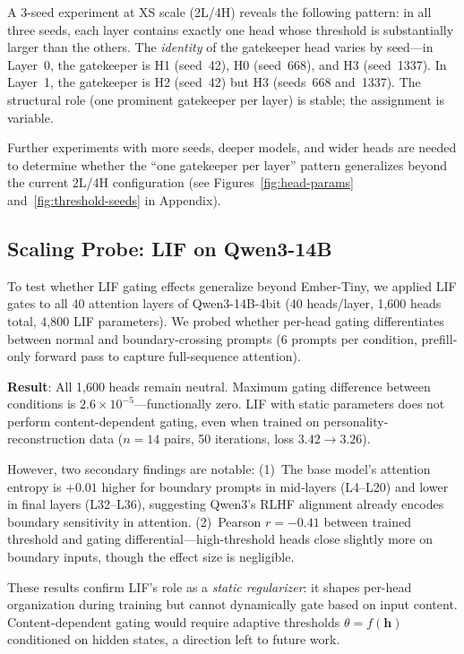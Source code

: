 \documentclass[11pt]{article}
\begin{document}
A 3-seed experiment at XS scale (2L/4H) reveals the following pattern: in all three seeds, each layer contains exactly one head whose threshold is substantially larger than the others. The \emph{identity} of the gatekeeper head varies by seed---in Layer~0, the gatekeeper is H1 (seed~42), H0 (seed~668), and H3 (seed~1337). In Layer~1, the gatekeeper is H2 (seed~42) but H3 (seeds~668 and~1337). The structural role (one prominent gatekeeper per layer) is stable; the assignment is variable.

Further experiments with more seeds, deeper models, and wider heads are needed to determine whether the ``one gatekeeper per layer'' pattern generalizes beyond the current 2L/4H configuration (see Figures~\ref{fig:head-params} and~\ref{fig:threshold-seeds} in Appendix).

\subsection{Scaling Probe: LIF on Qwen3-14B}
\label{sec:qwen3}

To test whether LIF gating effects generalize beyond Ember-Tiny, we applied LIF gates to all 40 attention layers of Qwen3-14B-4bit (40 heads/layer, 1,600 heads total, 4,800 LIF parameters). We probed whether per-head gating differentiates between normal and boundary-crossing prompts (6 prompts per condition, prefill-only forward pass to capture full-sequence attention).

\textbf{Result}: All 1,600 heads remain neutral. Maximum gating difference between conditions is $2.6 \times 10^{-5}$---functionally zero. LIF with static parameters does not perform content-dependent gating, even when trained on personality-reconstruction data ($n = 14$ pairs, 50 iterations, loss $3.42 \to 3.26$).

However, two secondary findings are notable: (1)~The base model's attention entropy is $+0.01$ higher for boundary prompts in mid-layers (L4--L20) and lower in final layers (L32--L36), suggesting Qwen3's RLHF alignment already encodes boundary sensitivity in attention. (2)~Pearson $r = -0.41$ between trained threshold and gating differential---high-threshold heads close slightly more on boundary inputs, though the effect size is negligible.

These results confirm LIF's role as a \emph{static regularizer}: it shapes per-head organization during training but cannot dynamically gate based on input content. Content-dependent gating would require adaptive thresholds $\theta = f(\mathbf{h})$ conditioned on hidden states, a direction left to future work.
\end{document}
